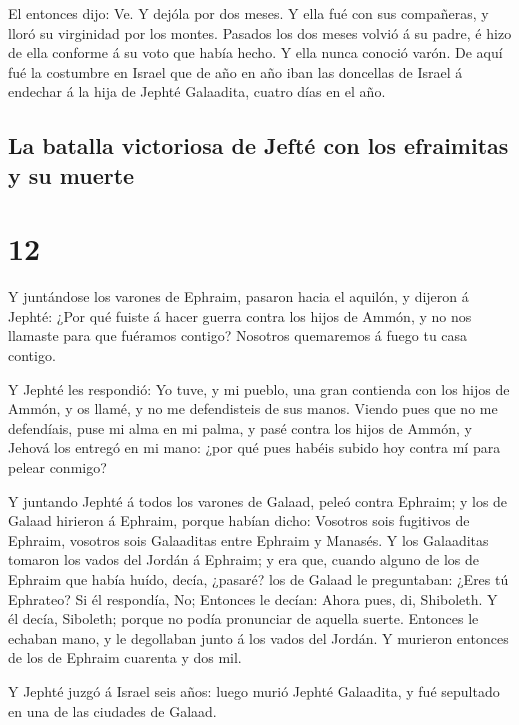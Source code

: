  El entonces dijo: Ve. Y dejóla por dos meses. Y ella fué
con sus compañeras, y lloró su virginidad por los montes. 
Pasados los dos meses volvió á su padre, é hizo de ella conforme á su
voto que había hecho. Y ella nunca conoció varón.  De aquí
fué la costumbre en Israel que de año en año iban las doncellas de
Israel á endechar á la hija de Jephté Galaadita, cuatro días en el año.

\hypertarget{la-batalla-victoriosa-de-jeftuxe9-con-los-efraimitas-y-su-muerte}{%
\subsection{La batalla victoriosa de Jefté con los efraimitas y su
muerte}\label{la-batalla-victoriosa-de-jeftuxe9-con-los-efraimitas-y-su-muerte}}

\hypertarget{section-11}{%
\section{12}\label{section-11}}

 Y juntándose los varones de Ephraim, pasaron hacia el
aquilón, y dijeron á Jephté: ¿Por qué fuiste á hacer guerra contra los
hijos de Ammón, y no nos llamaste para que fuéramos contigo? Nosotros
quemaremos á fuego tu casa contigo.

 Y Jephté les respondió: Yo tuve, y mi pueblo, una gran
contienda con los hijos de Ammón, y os llamé, y no me defendisteis de
sus manos.  Viendo pues que no me defendíais, puse mi alma
en mi palma, y pasé contra los hijos de Ammón, y Jehová los entregó en
mi mano: ¿por qué pues habéis subido hoy contra mí para pelear conmigo?

 Y juntando Jephté á todos los varones de Galaad, peleó
contra Ephraim; y los de Galaad hirieron á Ephraim, porque habían dicho:
Vosotros sois fugitivos de Ephraim, vosotros sois Galaaditas entre
Ephraim y Manasés.  Y los Galaaditas tomaron los vados del
Jordán á Ephraim; y era que, cuando alguno de los de Ephraim que había
huído, decía, ¿pasaré? los de Galaad le preguntaban: ¿Eres tú Ephrateo?
Si él respondía, No;  Entonces le decían: Ahora pues, di,
Shiboleth. Y él decía, Siboleth; porque no podía pronunciar de aquella
suerte. Entonces le echaban mano, y le degollaban junto á los vados del
Jordán. Y murieron entonces de los de Ephraim cuarenta y dos mil.

 Y Jephté juzgó á Israel seis años: luego murió Jephté
Galaadita, y fué sepultado en una de las ciudades de Galaad.


